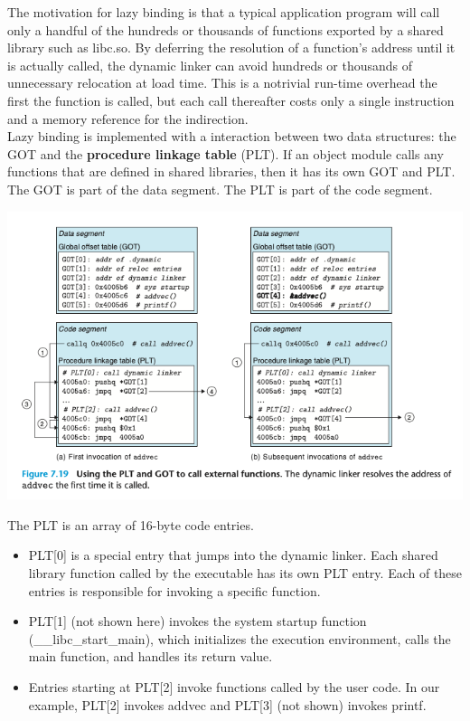 \documentclass[11pt]{article}
\begin{document}
The motivation for lazy binding is that a typical application program will call only a handful of the hundreds or thousands of functions exported by a shared library such as libc.so. By deferring the resolution of a function's address until it is actually called, the dynamic linker can avoid hundreds or thousands of unnecessary relocation at load time. This is a notrivial run-time overhead the first the function is called, but each call thereafter costs only a single instruction and a memory reference for the indirection.\\


Lazy binding is implemented with a interaction between two data structures: the GOT and the \textbf{procedure linkage table} (PLT). If an object module calls any functions that are defined in shared libraries, then it has its own GOT and PLT. The GOT is part of the data segment. The PLT is part of the code segment.\\


\begin{center}
\includegraphics[width=.9\linewidth]{pics/figure7.19-pic-function-call.png}
\end{center}


The PLT is an array of 16-byte code entries.\\
\begin{itemize}
\item PLT[0] is a special entry that jumps into the dynamic linker. Each shared library function called by the executable has its own PLT entry. Each of these entries is responsible for invoking a specific function.\\
\item PLT[1] (not shown here) invokes the system startup function (\_\_libc\_start\_main), which initializes the execution environment, calls the main function, and handles its return value.\\
\item Entries starting at PLT[2] invoke functions called by the user code. In our example, PLT[2] invokes addvec and PLT[3] (not shown) invokes printf.\\
\end{itemize}
\end{document}
